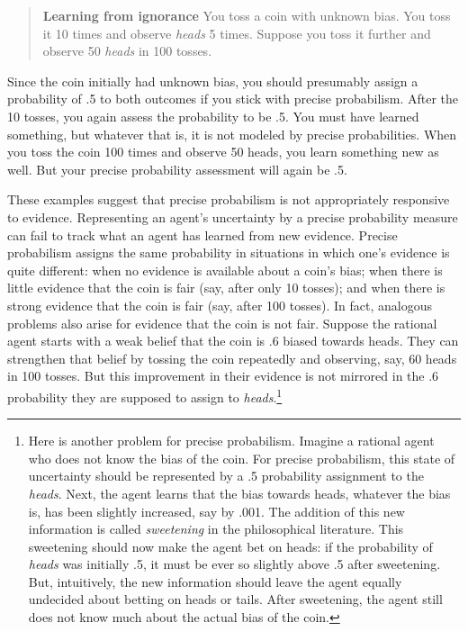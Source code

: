 \documentclass[
  letterpaper,
  DIV=11,
  numbers=noendperiod]{scrartcl}
\begin{document}
\begin{quote}
\textbf{Learning from ignorance}
You toss a coin with unknown bias. You toss it 10 times and observe \emph{heads} 5 times. Suppose you toss it further and observe 50 \emph{heads} in 100 tosses. 
\end{quote}

\noindent Since the coin initially had unknown bias, you should
presumably assign a probability of .5 to both outcomes if you stick with
precise probabilism. After the 10 tosses, you again assess the
probability to be .5. You must have learned something, but whatever that
is, it is not modeled by precise probabilities. When you toss the coin
100 times and observe 50 heads, you learn something new as well. But
your precise probability assessment will again be .5.

These examples suggest that precise probabilism is not appropriately
responsive to evidence. Representing an agent's uncertainty by a precise
probability measure can fail to track what an agent has learned from new
evidence. Precise probabilism assigns the same probability in situations
in which one's evidence is quite different: when no evidence is
available about a coin's bias; when there is little evidence that the
coin is fair (say, after only 10 tosses); and when there is strong
evidence that the coin is fair (say, after 100 tosses). In fact,
analogous problems also arise for evidence that the coin is not fair.
Suppose the rational agent starts with a weak belief that the coin is .6
biased towards heads. They can strengthen that belief by tossing the
coin repeatedly and observing, say, 60 heads in 100 tosses. But this
improvement in their evidence is not mirrored in the .6 probability they
are supposed to assign to \emph{heads}.\footnote{Here is another problem
  for precise probabilism. Imagine a rational agent who does not know
  the bias of the coin. For precise probabilism, this state of
  uncertainty should be represented by a .5 probability assignment to
  the \emph{heads}. Next, the agent learns that the bias towards heads,
  whatever the bias is, has been slightly increased, say by .001. The
  addition of this new information is called \emph{sweetening} in the
  philosophical literature. This sweetening should now make the agent
  bet on heads: if the probability of \emph{heads} was initially .5, it
  must be ever so slightly above .5 after sweetening. But, intuitively,
  the new information should leave the agent equally undecided about
  betting on heads or tails. After sweetening, the agent still does not
  know much about the actual bias of the coin.}
\end{document}
